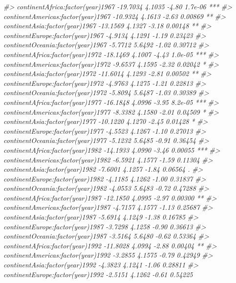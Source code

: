 \documentclass[
]{book}
\newenvironment{Shaded}{\begin{snugshade}}{\end{snugshade}}
\newcommand{\CommentTok}[1]{\textcolor[rgb]{0.56,0.35,0.01}{\textit{#1}}}
\begin{document}
\begin{Shaded}
\begin{Highlighting}[]
\CommentTok{#> continentAfrica:factor(year)1967   -19.7034     4.1035   -4.80  1.7e-06 ***}
\CommentTok{#> continentAmericas:factor(year)1967 -10.9324     4.1613   -2.63  0.00869 ** }
\CommentTok{#> continentAsia:factor(year)1967     -13.1569     4.1327   -3.18  0.00148 ** }
\CommentTok{#> continentEurope:factor(year)1967    -4.9134     4.1291   -1.19  0.23423    }
\CommentTok{#> continentOceania:factor(year)1967   -5.7712     5.6492   -1.02  0.30712    }
\CommentTok{#> continentAfrica:factor(year)1972   -18.1469     4.1007   -4.43  1.0e-05 ***}
\CommentTok{#> continentAmericas:factor(year)1972  -9.6537     4.1595   -2.32  0.02042 *  }
\CommentTok{#> continentAsia:factor(year)1972     -11.6014     4.1293   -2.81  0.00502 ** }
\CommentTok{#> continentEurope:factor(year)1972    -4.9763     4.1275   -1.21  0.22813    }
\CommentTok{#> continentOceania:factor(year)1972   -5.8094     5.6487   -1.03  0.30389    }
\CommentTok{#> continentAfrica:factor(year)1977   -16.1848     4.0996   -3.95  8.2e-05 ***}
\CommentTok{#> continentAmericas:factor(year)1977  -8.3382     4.1580   -2.01  0.04509 *  }
\CommentTok{#> continentAsia:factor(year)1977     -10.1220     4.1270   -2.45  0.01428 *  }
\CommentTok{#> continentEurope:factor(year)1977    -4.5523     4.1267   -1.10  0.27013    }
\CommentTok{#> continentOceania:factor(year)1977   -5.1232     5.6485   -0.91  0.36454    }
\CommentTok{#> continentAfrica:factor(year)1982   -14.1933     4.0990   -3.46  0.00055 ***}
\CommentTok{#> continentAmericas:factor(year)1982  -6.5921     4.1577   -1.59  0.11304    }
\CommentTok{#> continentAsia:factor(year)1982      -7.6001     4.1257   -1.84  0.06564 .  }
\CommentTok{#> continentEurope:factor(year)1982    -4.1185     4.1262   -1.00  0.31837    }
\CommentTok{#> continentOceania:factor(year)1982   -4.0553     5.6483   -0.72  0.47288    }
\CommentTok{#> continentAfrica:factor(year)1987   -12.1850     4.0995   -2.97  0.00300 ** }
\CommentTok{#> continentAmericas:factor(year)1987  -4.7157     4.1577   -1.13  0.25687    }
\CommentTok{#> continentAsia:factor(year)1987      -5.6914     4.1249   -1.38  0.16785    }
\CommentTok{#> continentEurope:factor(year)1987    -3.7298     4.1258   -0.90  0.36613    }
\CommentTok{#> continentOceania:factor(year)1987   -3.5164     5.6480   -0.62  0.53364    }
\CommentTok{#> continentAfrica:factor(year)1992   -11.8028     4.0994   -2.88  0.00404 ** }
\CommentTok{#> continentAmericas:factor(year)1992  -3.2855     4.1575   -0.79  0.42949    }
\CommentTok{#> continentAsia:factor(year)1992      -4.3823     4.1241   -1.06  0.28811    }
\CommentTok{#> continentEurope:factor(year)1992    -2.5151     4.1262   -0.61  0.54225    }

\end{Highlighting}
\end{Shaded}
\end{document}
